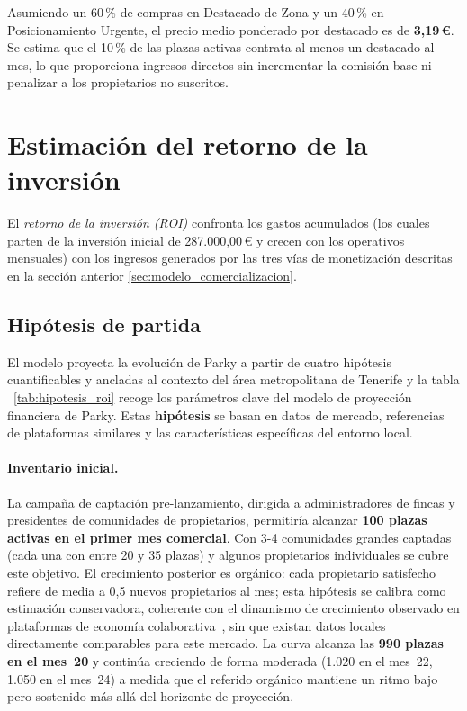 Asumiendo un 60\,\% de compras en Destacado de Zona y un 40\,\% en Posicionamiento Urgente, el precio medio ponderado por destacado es de \textbf{3,19\,€}. Se estima que el 10\,\% de las plazas activas contrata al menos un destacado al mes, lo que proporciona ingresos directos sin incrementar la comisión base ni penalizar a los propietarios no suscritos.

\section{Estimación del retorno de la inversión}
\label{sec:estimacion_roi}

El \textit{retorno de la inversión (ROI)} confronta los gastos acumulados (los cuales parten de la inversión inicial de 287.000,00\,€ y crecen con los operativos mensuales) con los ingresos generados por las tres vías de monetización descritas en la sección anterior \ref{sec:modelo_comercializacion}.

\subsection{Hipótesis de partida}
\label{subsec:hipotesis_roi}

El modelo proyecta la evolución de Parky a partir de cuatro hipótesis cuantificables y ancladas al contexto del área metropolitana de Tenerife y la tabla ~\ref{tab:hipotesis_roi} recoge los parámetros clave del modelo de proyección financiera de Parky. Estas \textbf{hipótesis} se basan en datos de mercado, referencias de plataformas similares y las características específicas del entorno local.

\paragraph{Inventario inicial.} La campaña de captación pre-lanzamiento, dirigida a administradores de fincas y presidentes de comunidades de propietarios, permitiría alcanzar \textbf{100 plazas activas en el primer mes comercial}. Con 3-4 comunidades grandes captadas (cada una con entre 20 y 35 plazas) y algunos propietarios individuales se cubre este objetivo. El crecimiento posterior es orgánico: cada propietario satisfecho refiere de media a 0,5 nuevos propietarios al mes; esta hipótesis se calibra como estimación conservadora, coherente con el dinamismo de crecimiento observado en plataformas de economía colaborativa~\cite{grandviewresearch2022}, sin que existan datos locales directamente comparables para este mercado. La curva alcanza las \textbf{990 plazas en el mes~20} y continúa creciendo de forma moderada (1.020 en el mes~22, 1.050 en el mes~24) a medida que el referido orgánico mantiene un ritmo bajo pero sostenido más allá del horizonte de proyección.

